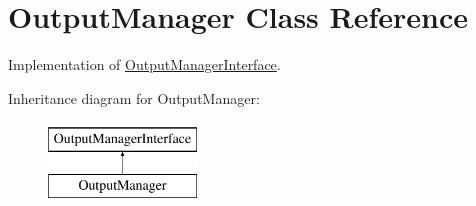 \hypertarget{classOutputManager}{\section{Output\-Manager Class Reference}
\label{classOutputManager}
}


Implementation of \hyperlink{interfaceOutputManagerInterface}{Output\-Manager\-Interface}.  


Inheritance diagram for Output\-Manager\-:\begin{figure}[H]
\begin{center}
\leavevmode
\includegraphics[height=2.000000cm]{classOutputManager}
\end{center}
\end{figure}
